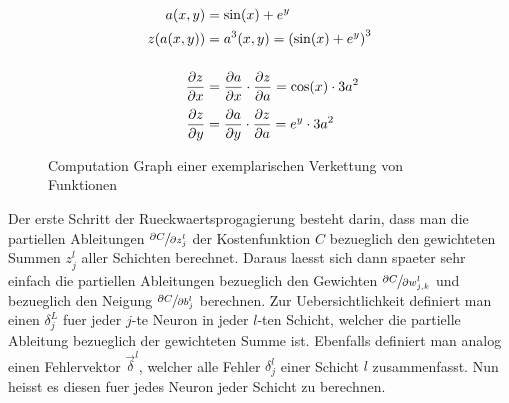\begin{figure}[h!]
  \begin{minipage}[h!]{0.5\textwidth}
    \centering

  \end{minipage}
  \begin{minipage}[h!]{0.5\textwidth}
    \begin{align*} %
      a(x,y) &= \sin(x) + e^y \\
      z(a(x,y)) &= a^3(x,y) = \left(\sin(x) + e^y\right)^3 \\[3ex]
      \partderiv{z}{x} &= \partderiv{a}{x} \cdot  \partderiv{z}{a} = \cos(x) \cdot 3a^2 \\[0.5ex]
      \partderiv{z}{y} &= \partderiv{a}{y} \cdot \partderiv{z}{a} = e^y \cdot 3a^2
    \end{align*}
  \end{minipage}

  \caption{Computation Graph einer exemplarischen Verkettung von Funktionen}
  \label{fig:computation_graph}
\end{figure}

Der erste Schritt der Rueckwaertsprogagierung besteht darin, dass man die partiellen Ableitungen $\sfrac{\partial C}{\partial z_j^l}$
der Kostenfunktion $C$ bezueglich den gewichteten Summen $z_j^l$ aller Schichten
berechnet. Daraus laesst sich dann spaeter sehr einfach die partiellen Ableitungen
bezueglich den Gewichten $\sfrac{\partial C}{\partial w_{j,k}^l}$ und bezueglich den Neigung
$\sfrac{\partial C}{\partial b_j^l}$ berechnen.
\para{}
Zur Uebersichtlichkeit definiert man einen  $\delta_j^L$ fuer
jeder $j$-te Neuron in jeder $l$-ten Schicht, welcher die partielle Ableitung bezueglich der
gewichteten Summe ist. Ebenfalls definiert man analog einen Fehlervektor
$\vec{\delta}^l$, welcher alle Fehler $\delta_j^l$ einer Schicht $l$
zusammenfasst. Nun heisst es diesen fuer jedes Neuron jeder Schicht zu
berechnen.

